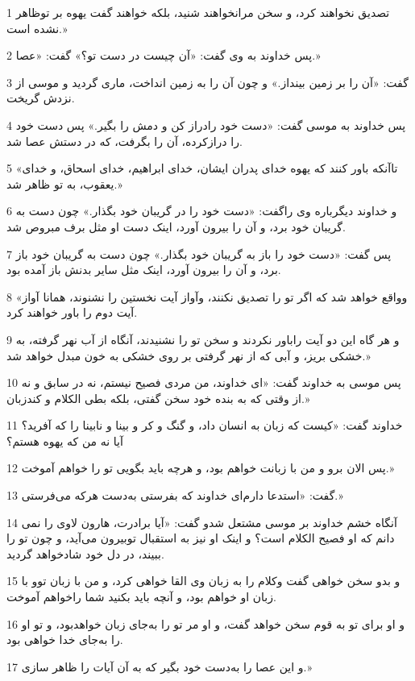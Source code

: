 \par 1 تصدیق نخواهند کرد، و سخن مرانخواهند شنید، بلکه خواهند گفت یهوه بر توظاهر نشده است.»
\par 2 پس خداوند به وی گفت: «آن چیست در دست تو؟» گفت: «عصا.»
\par 3 گفت: «آن را بر زمین بینداز.» و چون آن را به زمین انداخت، ماری گردید و موسی از نزدش گریخت.
\par 4 پس خداوند به موسی گفت: «دست خود رادراز کن و دمش را بگیر.» پس دست خود را درازکرده، آن را بگرفت، که در دستش عصا شد.
\par 5 «تاآنکه باور کنند که یهوه خدای پدران ایشان، خدای ابراهیم، خدای اسحاق، و خدای یعقوب، به تو ظاهر شد.»
\par 6 و خداوند دیگرباره وی راگفت: «دست خود را در گریبان خود بگذار.» چون دست به گریبان خود برد، و آن را بیرون آورد، اینک دست او مثل برف مبروص شد.
\par 7 پس گفت: «دست خود را باز به گریبان خود بگذار.» چون دست به گریبان خود باز برد، و آن را بیرون آورد، اینک مثل سایر بدنش باز آمده بود.
\par 8 «وواقع خواهد شد که اگر تو را تصدیق نکنند، وآواز آیت نخستین را نشنوند، همانا آواز آیت دوم را باور خواهند کرد.
\par 9 و هر گاه این دو آیت راباور نکردند و سخن تو را نشنیدند، آنگاه از آب نهر گرفته، به خشکی بریز، و آبی که از نهر گرفتی بر روی خشکی به خون مبدل خواهد شد.»
\par 10 پس موسی به خداوند گفت: «ای خداوند، من مردی فصیح نیستم، نه در سابق و نه از وقتی که به بنده خود سخن گفتی، بلکه بطی الکلام و کندزبان.»
\par 11 خداوند گفت: «کیست که زبان به انسان داد، و گنگ و کر و بینا و نابینا را که آفرید؟ آیا نه من که یهوه هستم؟
\par 12 پس الان برو و من با زبانت خواهم بود، و هر‌چه باید بگویی تو را خواهم آموخت.»
\par 13 گفت: «استدعا دارم‌ای خداوند که بفرستی به‌دست هر‌که می‌فرستی.»
\par 14 آنگاه خشم خداوند بر موسی مشتعل شدو گفت: «آیا برادرت، هارون لاوی را نمی دانم که او فصیح الکلام است؟ و اینک او نیز به استقبال توبیرون می‌آید، و چون تو را ببیند، در دل خود شادخواهد گردید.
\par 15 و بدو سخن خواهی گفت وکلام را به زبان وی القا خواهی کرد، و من با زبان توو با زبان او خواهم بود، و آنچه باید بکنید شما راخواهم آموخت.
\par 16 و او برای تو به قوم سخن خواهد گفت، و او مر تو را به‌جای زبان خواهدبود، و تو او را به‌جای خدا خواهی بود. 
\par 17 و این عصا را به‌دست خود بگیر که به آن آیات را ظاهر سازی.»

